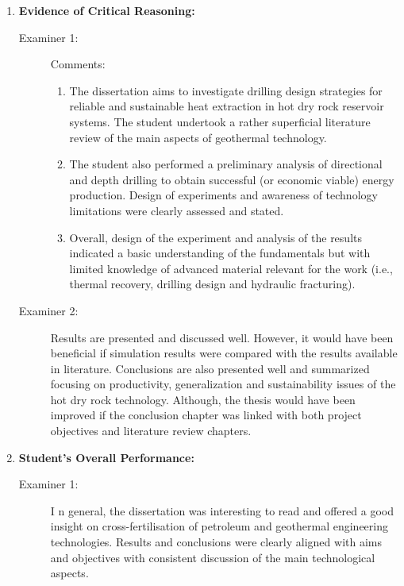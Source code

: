 \documentclass[14pt,twoside]{report}
\begin{document}
\begin{enumerate}
\begin{description}
        \end{description} 
%
    \item {\bf Evidence of Critical Reasoning:}
        \begin{description}
            \item[Examiner 1:] Comments:
               \begin{enumerate}
                     \item The dissertation aims to investigate drilling design strategies for reliable and sustainable heat extraction in hot dry rock reservoir systems. The student undertook a rather superficial literature review of the main aspects of geothermal technology. 
                     \item The student also performed a preliminary analysis of directional and depth drilling to obtain successful (or economic viable) energy production. Design of experiments and awareness of technology limitations were clearly assessed and stated.
                     \item Overall, design of the experiment and analysis of the results indicated a basic understanding of the fundamentals but with limited knowledge of advanced material relevant for the work (i.e., thermal recovery, drilling design and hydraulic fracturing).
                \end{enumerate}

            \item[Examiner 2:] Results are presented and discussed well. However, it would have been beneficial if simulation results were compared with the results available in literature. Conclusions are also presented well and summarized focusing on productivity, generalization and sustainability issues of the hot dry rock technology. Although, the thesis would have been improved if the conclusion chapter was linked with both project objectives and literature review chapters. 
 
 
        \end{description}
%
    \item {\bf Student's Overall Performance:}
        \begin{description}
            \item[Examiner 1:]I n general, the dissertation was interesting to read and offered a good insight on cross-fertilisation of petroleum and geothermal engineering technologies. Results and conclusions were clearly aligned with aims and objectives with consistent discussion of the main technological aspects. 


\end{description}
\end{enumerate}
\end{document}
